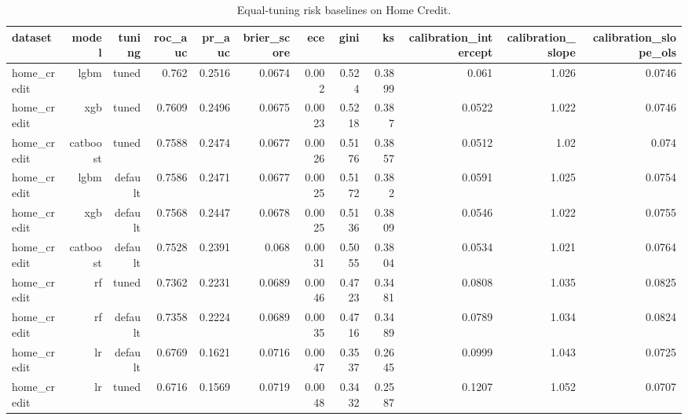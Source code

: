 \begin{table}[htbp]
  \centering
  \caption{Equal-tuning risk baselines on Home Credit.}
  \label{tab:T5_risk_baselines_home_credit}
  \small
  \begin{tabular}{lrrrrrrrrrrr}
    \toprule
    dataset & model & tuning & roc\_auc & pr\_auc & brier\_score & ece & gini & ks & calibration\_intercept & calibration\_slope & calibration\_slope\_ols \\
    \midrule
    home\_credit & lgbm & tuned & 0.762 & 0.2516 & 0.0674 & 0.002 & 0.524 & 0.3899 & 0.061 & 1.026 & 0.0746 \\
    home\_credit & xgb & tuned & 0.7609 & 0.2496 & 0.0675 & 0.0023 & 0.5218 & 0.387 & 0.0522 & 1.022 & 0.0746 \\
    home\_credit & catboost & tuned & 0.7588 & 0.2474 & 0.0677 & 0.0026 & 0.5176 & 0.3857 & 0.0512 & 1.02 & 0.074 \\
    home\_credit & lgbm & default & 0.7586 & 0.2471 & 0.0677 & 0.0025 & 0.5172 & 0.382 & 0.0591 & 1.025 & 0.0754 \\
    home\_credit & xgb & default & 0.7568 & 0.2447 & 0.0678 & 0.0025 & 0.5136 & 0.3809 & 0.0546 & 1.022 & 0.0755 \\
    home\_credit & catboost & default & 0.7528 & 0.2391 & 0.068 & 0.0031 & 0.5055 & 0.3804 & 0.0534 & 1.021 & 0.0764 \\
    home\_credit & rf & tuned & 0.7362 & 0.2231 & 0.0689 & 0.0046 & 0.4723 & 0.3481 & 0.0808 & 1.035 & 0.0825 \\
    home\_credit & rf & default & 0.7358 & 0.2224 & 0.0689 & 0.0035 & 0.4716 & 0.3489 & 0.0789 & 1.034 & 0.0824 \\
    home\_credit & lr & default & 0.6769 & 0.1621 & 0.0716 & 0.0047 & 0.3537 & 0.2645 & 0.0999 & 1.043 & 0.0725 \\
    home\_credit & lr & tuned & 0.6716 & 0.1569 & 0.0719 & 0.0048 & 0.3432 & 0.2587 & 0.1207 & 1.052 & 0.0707 \\
    \bottomrule
  \end{tabular}
\end{table}

